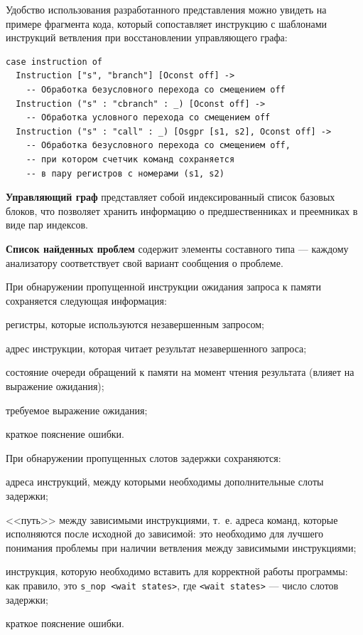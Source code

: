 \documentclass[a4paper,14pt]{extarticle}
\begin{document}
{\begin{ol}
Удобство использования разработанного представления можно увидеть на примере фрагмента кода,
который сопоставляет инструкцию с шаблонами инструкций ветвления
при восстановлении управляющего графа:
\begin{verbatim}
case instruction of
  Instruction ["s", "branch"] [Oconst off] ->
    -- Обработка безусловного перехода со смещением off
  Instruction ("s" : "cbranch" : _) [Oconst off] ->
    -- Обработка условного перехода со смещением off
  Instruction ("s" : "call" : _) [Osgpr [s1, s2], Oconst off] ->
    -- Обработка безусловного перехода со смещением off,
    -- при котором счетчик команд сохраняется
    -- в пару регистров с номерами (s1, s2)
\end{verbatim}

\item \textbf{Управляющий граф} представляет собой индексированный список базовых блоков,
  что позволяет хранить информацию о предшественниках и преемниках в виде пар индексов.

\item \textbf{Список найденных проблем} содержит элементы составного типа — каждому анализатору
соответствует свой вариант сообщения о проблеме.

При обнаружении пропущенной инструкции ожидания запроса к памяти сохраняется следующая информация:
\begin{ul}
\item регистры, которые используются незавершенным запросом;
\item адрес инструкции, которая читает результат незавершенного запроса;
\item состояние очереди обращений к памяти на момент чтения результата (влияет на выражение ожидания);
\item требуемое выражение ожидания;
\item краткое пояснение ошибки.
\end{ul}

При обнаружении пропущенных слотов задержки сохраняются:
\begin{ul}
\item адреса инструкций, между которыми необходимы дополнительные слоты задержки;
\item <<путь>> между зависимыми инструкциями, т.~е. адреса команд, которые исполняются после исходной до зависимой:
это необходимо для лучшего понимания проблемы при наличии ветвления между зависимыми инструкциями;
\item инструкция, которую необходимо вставить для корректной работы программы:
как правило, это \verb|s_nop <wait states>|, где \verb|<wait states>| — число слотов задержки;
\item краткое пояснение ошибки.
\end{ul}


\end{ol}}
\end{document}
